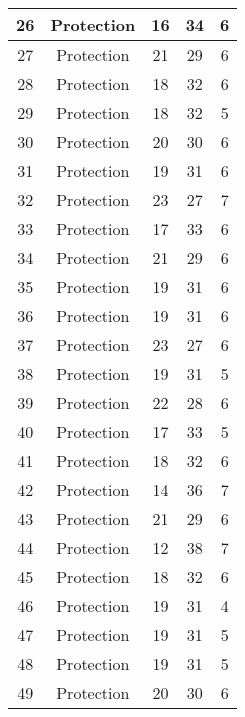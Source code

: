 \documentclass[results.tex]{subfiles}
\begin{document}
\begin{center}
\begin{tabular}{| c || c | c | c | c |}
    \hline
    26 & Protection & 16 & 34 & 6 \\ 
    \hline
    27 & Protection & 21 & 29 & 6 \\ 
    \hline
    28 & Protection & 18 & 32 & 6 \\ 
    \hline
    29 & Protection & 18 & 32 & 5 \\ 
    \hline
    30 & Protection & 20 & 30 & 6 \\ 
    \hline
    31 & Protection & 19 & 31 & 6 \\ 
    \hline
    32 & Protection & 23 & 27 & 7 \\ 
    \hline
    33 & Protection & 17 & 33 & 6 \\ 
    \hline
    34 & Protection & 21 & 29 & 6 \\ 
    \hline
    35 & Protection & 19 & 31 & 6 \\ 
    \hline
    36 & Protection & 19 & 31 & 6 \\ 
    \hline
    37 & Protection & 23 & 27 & 6 \\ 
    \hline
    38 & Protection & 19 & 31 & 5 \\ 
    \hline
    39 & Protection & 22 & 28 & 6 \\ 
    \hline
    40 & Protection & 17 & 33 & 5 \\ 
    \hline
    41 & Protection & 18 & 32 & 6 \\ 
    \hline
    42 & Protection & 14 & 36 & 7 \\ 
    \hline
    43 & Protection & 21 & 29 & 6 \\ 
    \hline
    44 & Protection & 12 & 38 & 7 \\ 
    \hline
    45 & Protection & 18 & 32 & 6 \\ 
    \hline
    46 & Protection & 19 & 31 & 4 \\ 
    \hline
    47 & Protection & 19 & 31 & 5 \\ 
    \hline
    48 & Protection & 19 & 31 & 5 \\ 
    \hline
    49 & Protection & 20 & 30 & 6 \\ 
    \hline   \end{tabular}
\end{center}
\end{document}
